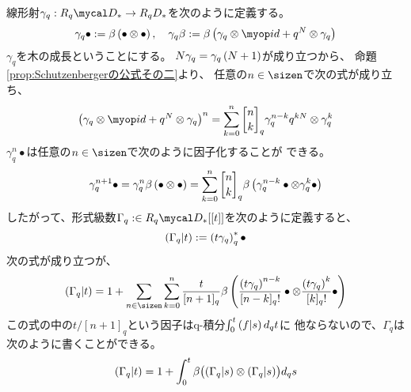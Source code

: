{	線形射$\gamma_q:R_q\D_*\to R_qD_*$を次のように定義する。
	\begin{equation*}\begin{split}
		\gamma_q\bullet := \beta\lr{\bullet\otimes\bullet},\quad
		\gamma_q\beta := \beta\lr{\gamma_q\otimes\id + q^N\otimes\gamma_q}
	\end{split}\end{equation*}
	$\gamma_q$を木の成長ということにする。
	$N\gamma_q=\gamma_q\left({N+1}\right)$が成り立つから、
	命題\ref{prop:Schutzenbergerの公式その二}より、
	任意の$n\in\sizen$で次の式が成り立ち、
	\begin{equation}\label{eq:木の成長の因子化その一}\begin{split}
		\lr{\gamma_q\otimes\id + q^N\otimes\gamma_q}^n
		= \sum_{k=0}^n\qbinom{n}{k}_q \gamma_q^{n-k}q^{kN}\otimes\gamma_q^k
	\end{split}\end{equation}
	$\gamma_q^n\bullet$は任意の$n\in\sizen$で次のように因子化することが
	できる。
	\begin{equation}\label{eq:木の成長の因子化その二}\begin{split}
		\gamma_q^{n+1}\bullet = \gamma_q^n\beta\lr{\bullet\otimes\bullet}
		= \sum_{k=0}^n\qbinom{n}{k}_q\beta\lr{\gamma_q^{n-k}\bullet
			\otimes\gamma_q^k\bullet}
	\end{split}\end{equation}
	したがって、形式級数$\Gamma_q:\in R_q\D_*[[t]]$を次のように定義すると、
	\begin{equation*}\begin{split}
		\left({\Gamma_q|t}\right) := \left({t\gamma_q}\right)_q^*\bullet
	\end{split}\end{equation*}
	次の式が成り立つが、
	\begin{equation*}\begin{split}
		\lr{\Gamma_q|t} = 1 + \sum_{n\in\sizen}\sum_{k=0}^n \frac{t}{[n+1]_q}
			\beta\lr{\frac{\lr{t\gamma_q}^{n-k}}{[n-k]_q!}\bullet
			\otimes\frac{\lr{t\gamma_q}^k}{[k]_q!}\bullet}
	\end{split}\end{equation*}
	この式の中の$t/[n+1]_q$という因子はq-積分$\int_0^t\left({f|s}\right)d_qt$に
	他ならないので、$\Gamma_q$は次のように書くことができる。
	\begin{equation}\label{eq:q-Dyck微分方程式その一}\begin{split}
		\left({\Gamma_q|t}\right) = 1 + \int_0^t \beta\bigl({\left({\Gamma_q|s}\right)
			\otimes\left({\Gamma_q|s}\right)}\bigr) d_qs
	\end{split}\end{equation}

}
